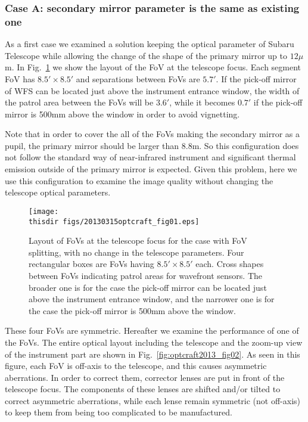 \subsubsection{Case A: secondary mirror parameter is the same as
   existing one}

As a first case we examined a solution keeping the optical parameter of
Subaru Telescope while allowing the change of the shape of the primary
mirror up to $12\mu$m. 
In Fig.~\ref{fig:optcraft2013_fig01} we show the layout of the FoV at
the telescope focus. Each segment FoV has $8.5'\times8.5'$ and
separations between FoVs are $5.7'$. If the pick-off mirror of WFS can
be located just above the instrument entrance window, the width of the
patrol area between the FoVs will be $3.6'$, while it becomes $0.7'$ if
the pick-off mirror is 500mm above the window in order to avoid
vignetting. 

Note that in order to cover the all of the FoVs making the secondary
mirror as a pupil, the primary mirror should be larger than 8.8m. So
this configuration does not follow the standard way of near-infrared
instrument and significant thermal emission outside of the primary
mirror is expected. Given this problem, here we use this configuration
to examine the image quality without changing the telescope optical
parameters. 

\begin{figure}[!ht]
\centerline{
\texttt{[image: \\thisdir figs/20130315optcraft\_fig01.eps]}
}
\caption{Layout of FoVs at the telescope focus for the case with FoV
 splitting, with no change in the telescope parameters. Four rectangular
 boxes are FoVs having $8.5'\times8.5'$ each. Cross shapes between FoVs
 indicating patrol areas for wavefront sensors. The broader one is for
 the case the pick-off mirror can be located just above the instrument
 entrance window, and the narrower one is for the case the pick-off
 mirror is 500mm above the window.
}
\label{fig:optcraft2013_fig01}
\end{figure}

These four FoVs are symmetric. Hereafter we examine the performance of
one of the FoVs. The entire optical layout including the telescope and
the zoom-up view of the instrument part are shown in
Fig.~\ref{fig:optcraft2013_fig02}.
As seen in this figure, each FoV is off-axis to the telescope, and this
causes asymmetric aberrations. In order to correct them, corrector
lenses are put in front of the telescope focus. The components of these
lenses are shifted and/or tilted to correct asymmetric aberrations,
while each lense remain symmetric (not off-axis) to keep them from being
too complicated to be manufactured.

